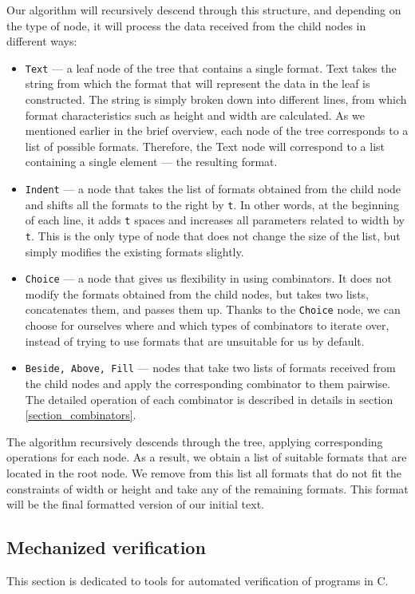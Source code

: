 \documentclass[14pt]{constructor-diploma}
\begin{document}
Our algorithm will recursively descend through this structure, 
and depending on the type of node, it will process the data received from the child nodes in different ways:
\begin{itemize}
  \item \texttt{Text} --- a leaf node of the tree that contains a single format.
    Text takes the string from which the format that will represent the data in the leaf is constructed. 
    The string is simply broken down into different lines, from which format characteristics such as height and width are calculated.
    As we mentioned earlier in the brief overview, each node of the tree corresponds to a list of possible formats. 
    Therefore, the Text node will correspond to a list containing a single element --- the resulting format.
  \item \texttt{Indent} --- a node that takes the list of formats obtained from the child node 
    and shifts all the formats to the right by \texttt{t}. In other words, 
    at the beginning of each line, it adds \texttt{t} spaces and increases all parameters related to width by \texttt{t}. 
    This is the only type of node that does not change the size of the list, but simply modifies the existing formats slightly.
  \item \texttt{Choice} --- a node that gives us flexibility in using combinators. 
    It does not modify the formats obtained from the child nodes, but takes two lists, 
    concatenates them, and passes them up. Thanks to the \texttt{Choice} node, 
    we can choose for ourselves where and which types of combinators to iterate over, 
    instead of trying to use formats that are unsuitable for us by default.
  \item \texttt{Beside, Above, Fill} --- nodes that take two lists of formats received from the child nodes 
    and apply the corresponding combinator to them pairwise. 
    The detailed operation of each combinator is described in details in section \ref{section_combinators}.
\end{itemize}

The algorithm recursively descends through the tree, applying corresponding operations for each node. 
As a result, we obtain a list of suitable formats that are located in the root node. 
We remove from this list all formats that do not fit the constraints of width or height 
and take any of the remaining formats. This format will be the final formatted version of our initial text.

\subsection{Mechanized verification}
This section is dedicated to tools for automated verification of programs in C.
\end{document}
